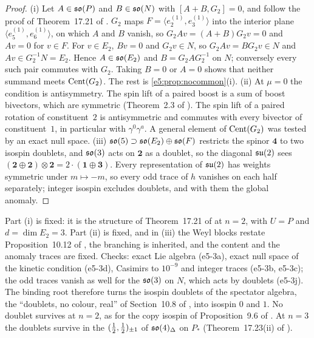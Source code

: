 \begin{proof}
(i) Let $A\in\mathfrak{so}(P)$ and $B\in\mathfrak{so}(N)$ with $[A+B,G_2]=0$, and follow the proof of Theorem~17.21 of \cite{ES17}. $G_2$ maps $F=\langle e^{(1)}_2,e^{(1)}_3\rangle$
into the interior plane $\langle e^{(1)}_5,e^{(1)}_6\rangle$, on which $A$ and $B$ vanish, so $G_2Av=(A+B)G_2v=0$ and $Av=0$ for $v\in F$. For $v\in E_2$,
$Bv=0$ and $G_2v\in N$, so $G_2Av=BG_2v\in N$ and $Av\in G_2^{-1}N=E_2$. Hence $A\in\mathfrak{so}(E_2)$ and $B=G_2AG_2^{-1}$ on $N$; conversely every such pair
commutes with $G_2$. Taking $B=0$ or $A=0$ shows that neither summand meets $\operatorname{Cent}(G_2)$. The rest is \cref{e5:prop:nocommon}(i). (ii) At $\mu=0$ the
condition is antisymmetry. The spin lift of a paired boost is a sum of boost bivectors, which are symmetric (Theorem~2.3 of \cite{ES17}). The spin lift
of a paired rotation of constituent~$2$ is antisymmetric and commutes with every bivector of constituent~$1$, in particular with $\gamma^0\gamma^a$.
A general element of $\operatorname{Cent}(G_2)$ was tested by an exact null space. (iii) $\mathfrak{so}(5)\supset\mathfrak{so}(E_2)\oplus\mathfrak{so}(F)$ restricts the spinor $\mathbf4$ to two
isospin doublets, and $\mathfrak{so}(3)$ acts on $\mathbf2$ as a doublet, so the diagonal $\mathfrak{su}(2)$ sees $(\mathbf2\oplus\mathbf2)\otimes\mathbf2=2\cdot(\mathbf1\oplus\mathbf3)$.
Every representation of $\mathfrak{su}(2)$ has weights symmetric under $m\mapsto-m$, so every odd trace of $h$ vanishes on each half
separately; integer isospin excludes doublets, and with them the global anomaly.
\end{proof}

Part (i) is fixed: it is the structure of Theorem~17.21 of \cite{ES17} at $n=2$, with $U=P$ and $d=\dim E_2=3$. Part (ii) is fixed, and in
(iii) the Weyl blocks restate Proposition~10.12 of \cite{ES17}, the branching is inherited, and the content and the anomaly traces are fixed. Checks:
exact Lie algebra (e5-3a), exact null space of the kinetic condition (e5-3d), Casimirs to $10^{-9}$ and integer traces (e5-3b, e5-3c); the odd traces vanish as well for the $\mathfrak{so}(3)$ on $N$, which
acts by doublets (e5-3j). The binding
root therefore turns the isospin doublets of the spectator algebra, the ``doublets, no colour, real'' of Section~10.8 of \cite{ES17}, into isospin
$0$ and $1$. No doublet survives at $n=2$, as for the copy isospin of Proposition~9.6 of \cite{RE}. At $n=3$ the doublets survive in the
$(\tfrac12,\tfrac12)_{\pm1}$ of $\mathfrak{so}(4)_\Delta$ on $P_*$ (Theorem~17.23(ii) of \cite{ES17}).

